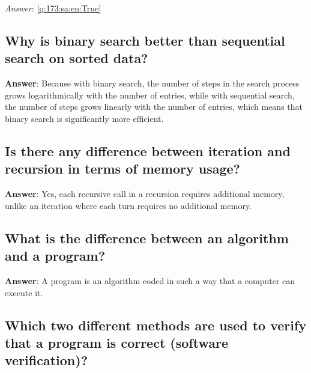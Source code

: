 \documentclass[a4paper,11pt,oneside]{article}
\begin{document}
\begin{sloppypar}
\label{q:173:sa:en:True}

\vspace{2cm}

\noindent\makebox[\textwidth]{\hrulefill}

\vspace{1cm}

\textit{Answer}: \autoref{q:173:sa:en:True}



\subsection{Why is binary search better than sequential search on sorted data?}

\label{q:174:sa:en:True}

\textbf{Answer}: Because with binary search, the number of steps in the search process grows logarithmically with the number of entries, while with sequential search, the number of steps grows linearly with the number of entries, which means that binary search is significantly more efficient.



\subsection{Is there any difference between iteration and recursion in terms of memory usage?}

\label{q:175:sa:en:True}

\textbf{Answer}: Yes, each recursive call in a recursion requires additional memory, unlike an iteration where each turn requires no additional memory.



\subsection{What is the difference between an algorithm and a program?}

\label{q:177:sa:en:True}

\textbf{Answer}: A program is an algorithm coded in such a way that a computer can execute it.



\subsection{Which two different methods are used to verify that a program is correct (software verification)?}


\end{sloppypar}
\end{document}
